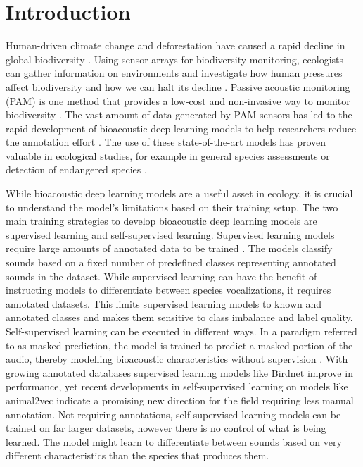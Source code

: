 \section{Introduction}
\label{sec:introcution}

Human-driven climate change and deforestation have caused a rapid decline in global biodiversity \cite{butchart_global_2010}.
Using sensor arrays for biodiversity monitoring, ecologists can gather information on environments and investigate how human pressures affect biodiversity and how we can halt its decline \cite{schmeller_building_2017}.
Passive acoustic monitoring (PAM) is one method that provides a low-cost and non-invasive way to monitor biodiversity \cite{sugai_terrestrial_2019}.
The vast amount of data generated by PAM sensors has led to the rapid development of bioacoustic deep learning models to help researchers reduce the annotation effort \cite{stowell_computational_2022}.
The use of these state-of-the-art models has proven valuable in ecological studies, for example in general species assessments \cite{tuia_perspectives_2022,cowans_improving_2024} or detection of endangered species \cite{allen-ankins_use_2025}.

While bioacoustic deep learning models are a useful asset in ecology, it is crucial to understand the model's limitations based on their training setup.
The two main training strategies to develop bioacoustic deep learning models are supervised learning and self-supervised learning.
Supervised learning models require large amounts of annotated data to be trained \cite{hagiwara_aves_2022}.
The models classify sounds based on a fixed number of predefined classes representing annotated sounds in the dataset.
While supervised learning can have the benefit of instructing models to differentiate between species vocalizations, it requires annotated datasets.
This limits supervised learning models to known and annotated classes and makes them sensitive to class imbalance and label quality.
Self-supervised learning can be executed in different ways.
In a paradigm referred to as masked prediction, the model is trained to predict a masked portion of the audio, thereby modelling bioacoustic characteristics without supervision \cite{baevski_efficient_2023,huang_masked_2022}.
With growing annotated databases supervised learning models like Birdnet \cite{kahl_birdnet_2021} improve in performance, yet recent developments in self-supervised learning on models like animal2vec \cite{schafer-zimmermann_animal2vec_2024} indicate a promising new direction for the field requiring less manual annotation.
Not requiring annotations, self-supervised learning models can be trained on far larger datasets, however there is no control of what is being learned.
The model might learn to differentiate between sounds based on very different characteristics than the species that produces them.

